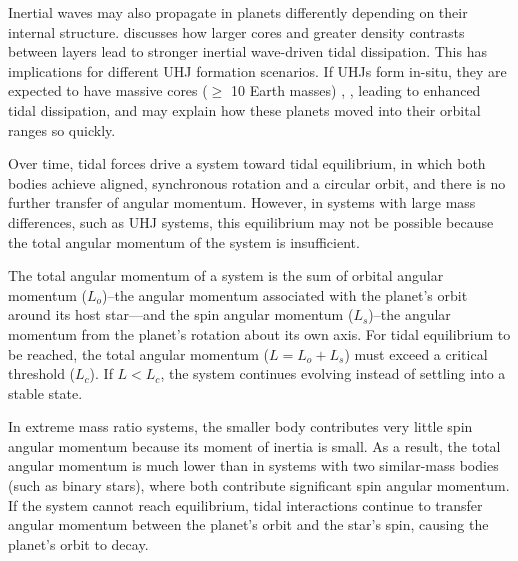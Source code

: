 \documentclass[oneside,12pt]{amsart}
\numberwithin{page}{section}
\begin{document}
Inertial waves may also propagate in planets differently depending on their internal structure. \citet{ogilvie2014tidal} discusses how larger cores and greater density contrasts between layers lead to stronger inertial wave-driven tidal dissipation. This has implications for different UHJ formation scenarios. If UHJs form in-situ, they are expected to have massive cores ($\geq$ 10 Earth masses) \citep{fortney2021hotjupiters}, \citep{dawson2018origins}, leading to enhanced tidal dissipation, and may explain how these planets moved into their orbital ranges so quickly.

Over time, tidal forces drive a system toward tidal equilibrium, in which both bodies achieve aligned, synchronous rotation and a circular orbit, and there is no further transfer of angular momentum. However, in systems with large mass differences, such as UHJ systems, this equilibrium may not be possible because the total angular momentum of the system is insufficient.

The total angular momentum of a system is the sum of orbital angular momentum ($L_o$)–the angular momentum associated with the planet's orbit around its host star—and the spin angular momentum ($L_s$)–the angular momentum from the planet’s rotation about its own axis.
For tidal equilibrium to be reached, the total angular momentum ($L = L_o + L_s$) must exceed a critical threshold ($L_c$). If $L < L_c$, the system continues evolving instead of settling into a stable state.

In extreme mass ratio systems, the smaller body contributes very little spin angular momentum because its moment of inertia is small. As a result, the total angular momentum is much lower than in systems with two similar-mass bodies (such as binary stars), where both contribute significant spin angular momentum. If the system cannot reach equilibrium, tidal interactions continue to transfer angular momentum between the planet’s orbit and the star’s spin, causing the planet’s orbit to decay.

\end{document}
